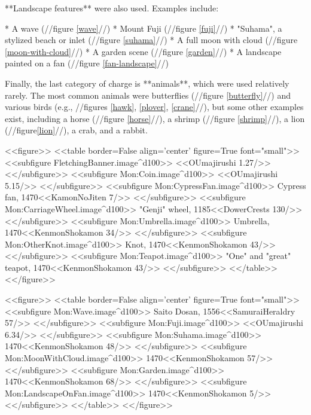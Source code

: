   **Landscape features** were also used.  Examples include:

  * A wave (//figure \ref{wave}//)
  * Mount Fuji (//figure \ref{fuji}//)
  * "Suhama", a stylized beach or inlet (//figure \ref{suhama}//)
  * A full moon with cloud (//figure \ref{moon-with-cloud}//)
  * A garden scene (//figure \ref{garden}//)
  * A landscape painted on a fan (//figure \ref{fan-landscape}//)

  Finally, the last category of charge is **animals**, which were used
  relatively rarely.  The most common animals were butterflies
  (//figure \ref{butterfly}//) and various birds (e.g., //figures
  \ref{hawk}, \ref{plover}, \ref{crane}//), but some other examples
  exist, including a horse (//figure \ref{horse}//), a shrimp
  (//figure \ref{shrimp}//), a lion (//figure\ref{lion}//), a crab,
  and a rabbit.

  <<figure>>
  <<table border=False align='center' figure=True font="small">>
  <<subfigure FletchingBanner.image^d100>>
    \label{fletching}<<OUmajirushi 1.27/>>
  <</subfigure>>
  <<subfigure Mon:Coin.image^d100>>
    \label{coin}<<OUmajirushi 5.15/>>
  <</subfigure>>
  <<subfigure Mon:CypressFan.image^d100>>
    \label{fan}Cypress fan, 1470<<KamonNoJiten 7/>>
  <</subfigure>>
  <<subfigure Mon:CarriageWheel.image^d100>>
    \label{wheel} "Genji" wheel, 1185<<DowerCrests 130/>>
  <</subfigure>>
  <<subfigure Mon:Umbrella.image^d100>>
    \label{umbrella} Umbrella, 1470<<KenmonShokamon 34/>>
  <</subfigure>>
  <<subfigure Mon:OtherKnot.image^d100>>
    \label{knot} Knot, 1470<<KenmonShokamon 43/>>
  <</subfigure>>
  <<subfigure Mon:Teapot.image^d100>>
    \label{teapot} "One" and "great" teapot, 1470<<KenmonShokamon 43/>>
  <</subfigure>>
  <</table>>
  <</figure>>

  <<figure>>
  <<table border=False align='center' figure=True font="small">>
  <<subfigure Mon:Wave.image^d100>>
    \label{wave}Saito Dosan, 1556<<SamuraiHeraldry 57/>>
  <</subfigure>>
  <<subfigure Mon:Fuji.image^d100>>
    \label{fuji}<<OUmajirushi 6.34/>>
  <</subfigure>>
  <<subfigure Mon:Suhama.image^d100>>
    \label{suhama}1470<<KenmonShokamon 48/>>
  <</subfigure>>
  <<subfigure Mon:MoonWithCloud.image^d100>>
    \label{moon-with-cloud}1470<<KenmonShokamon 57/>>
  <</subfigure>>
  <<subfigure Mon:Garden.image^d100>>
    \label{garden}1470<<KenmonShokamon 68/>>
  <</subfigure>>
  <<subfigure Mon:LandscapeOnFan.image^d100>>
    \label{fan-landscape}1470<<KenmonShokamon 5/>>
  <</subfigure>>
  <</table>>
  <</figure>>

